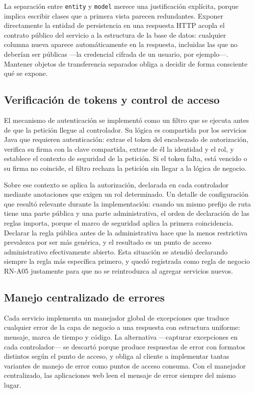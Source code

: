 La separación entre \texttt{entity} y \texttt{model} merece una justificación explícita, porque
implica escribir clases que a primera vista parecen redundantes. Exponer directamente la entidad
de persistencia en una respuesta HTTP acopla el contrato público del servicio a la estructura de
la base de datos: cualquier columna nueva aparece automáticamente en la respuesta, incluidas las
que no deberían ser públicas ---la credencial cifrada de un usuario, por ejemplo---. Mantener
objetos de transferencia separados obliga a decidir de forma consciente qué se expone.

\subsection{Verificación de tokens y control de acceso}
El mecanismo de autenticación se implementó como un filtro que se ejecuta antes de que la
petición llegue al controlador. Su lógica es compartida por los servicios Java que requieren autenticación: extrae el token del
encabezado de autorización, verifica su firma con la clave compartida, extrae de él la identidad
y el rol, y establece el contexto de seguridad de la petición. Si el token falta, está vencido o
su firma no coincide, el filtro rechaza la petición sin llegar a la lógica de negocio.

Sobre ese contexto se aplica la autorización, declarada en cada controlador mediante anotaciones
que exigen un rol determinado. Un detalle de configuración que resultó relevante durante la
implementación: cuando un mismo prefijo de ruta tiene una parte pública y una parte
administrativa, el orden de declaración de las reglas importa, porque el marco de seguridad
aplica la primera coincidencia. Declarar la regla pública antes de la administrativa hace que la
menos restrictiva prevalezca por ser más genérica, y el resultado es un punto de acceso
administrativo efectivamente abierto. Esta situación se atendió declarando siempre la regla más
específica primero, y quedó registrada como regla de negocio RN-A05 justamente para que no se
reintroduzca al agregar servicios nuevos.

\subsection{Manejo centralizado de errores}
Cada servicio implementa un manejador global de excepciones que traduce cualquier error de la
capa de negocio a una respuesta con estructura uniforme: mensaje, marca de tiempo y código. La
alternativa ---capturar excepciones en cada controlador--- se descartó porque produce respuestas
de error con formatos distintos según el punto de acceso, y obliga al cliente a implementar
tantas variantes de manejo de error como puntos de acceso consuma. Con el manejador centralizado,
las aplicaciones web leen el mensaje de error siempre del mismo lugar.

